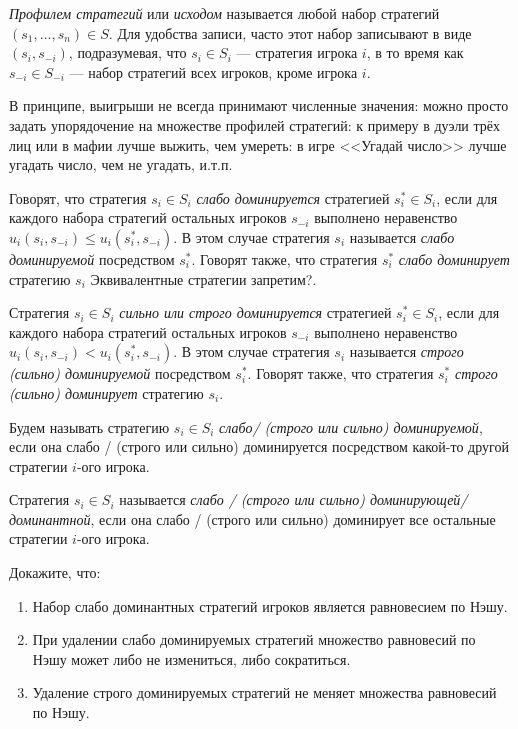 {\it Профилем стратегий}  или {\it исходом} называется любой набор стратегий $(s_1,\ldots,s_n) \in S $. Для удобства записи, часто этот набор записывают в виде $(s_i,s_{-i})$, подразумевая, что $s_i \in S_i$ --- стратегия игрока $i$, в то время как  $s_{-i} \in S_{-i}$ --- набор стратегий всех игроков, кроме игрока $i$.

В принципе, выигрыши не всегда принимают численные значения: можно просто задать упорядочение на множестве профилей стратегий: к примеру в дуэли трёх лиц или в мафии лучше выжить, чем умереть: в игре <<Угадай число>> лучше угадать число, чем не угадать, и.т.п.

Говорят, что стратегия $s_i \in S_i$ {\it слабо доминируется} стратегией $s^*_i \in S_i$, если для каждого набора стратегий остальных игроков $s_{-i}$ выполнено неравенство $u_i(s_i,s_{-i}) \leq u_i(s^*_i,s_{-i}).$ В этом случае стратегия $s_i$ называется {\it слабо доминируемой} посредством $s^*_i$. Говорят также, что стратегия $s^*_i$ {\it слабо доминирует} стратегию $s_i$ {\red Эквивалентные стратегии запретим?}.

Стратегия $s_i \in S_i$ {\it сильно или строго доминируется} стратегией $s^*_i \in S_i$, если для каждого набора стратегий остальных игроков $s_{-i}$ выполнено неравенство $u_i(s_i,s_{-i}) < u_i(s^*_i,s_{-i}).$ В этом случае стратегия $s_i$ называется {\it строго (сильно) доминируемой} посредством $s^*_i$. Говорят также, что стратегия $s^*_i$ {\it строго (сильно) доминирует} стратегию $s_i$.

Будем называть стратегию  $s_i \in S_i$ {\it слабо/ (строго или сильно) доминируемой}, если она слабо / (строго или сильно) доминируется посредством какой-то другой стратегии $i$-ого игрока.

Стратегия $s_i \in S_i$ называется {\it слабо / (строго или сильно) доминирующей/доминантной}, если она слабо / (строго или сильно) доминирует все остальные стратегии $i$-ого игрока.

\begin{problem} Докажите, что:
\begin{enumerate}
\item Набор слабо доминантных стратегий игроков является равновесием по Нэшу. 
\item При удалении слабо доминируемых стратегий множество равновесий по Нэшу может либо не измениться, либо сократиться.
\item Удаление строго доминируемых стратегий не меняет множества равновесий по Нэшу. 
\end{enumerate}
\end{problem}

